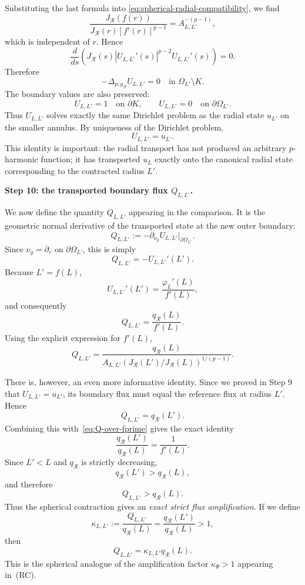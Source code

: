 \documentclass[11pt,a4paper]{article}
\theoremstyle{definition}
\theoremstyle{remark}
\begin{document}
Substituting the last formula into
\eqref{eq:spherical-radial-compatibility}, we find
\[
\frac{J_{\mathcal R}(f(r))}
{J_{\mathcal R}(r)[f'(r)]^{p-1}}
=A_{L,L'}^{-(p-1)},
\]
which is independent of $r$. Hence
\[
\frac{d}{ds}
\left(
J_{\mathcal R}(s)
|U_{L,L'}'(s)|^{p-2}U_{L,L'}'(s)
\right)=0.
\]
Therefore
\[
-\Delta_{p,g_{\mathcal R}}U_{L,L'}=0
\quad\text{in }\Omega_{L'}\setminus K.
\]
The boundary values are also preserved:
\[
U_{L,L'}=1\quad\text{on }\partial K,
\qquad
U_{L,L'}=0\quad\text{on }\partial\Omega_{L'}.
\]
Thus $U_{L,L'}$ solves exactly the same Dirichlet problem as the radial
state $u_{L'}$ on the smaller annulus. By uniqueness of the Dirichlet
problem,
\[
U_{L,L'}=u_{L'}.
\]
This identity is important: the radial transport has not produced an
arbitrary $p$-harmonic function; it has transported $u_L$ exactly onto the
canonical radial state corresponding to the contracted radius $L'$.

\medskip
\noindent
\textbf{Step 10: the transported boundary flux $Q_{L,L'}$.}

We now define the quantity $Q_{L,L'}$ appearing in the comparison.
It is the geometric normal derivative of the transported state at the new
outer boundary:
\[
Q_{L,L'}
:=-\partial_{\nu_g}U_{L,L'}
\big|_{\partial\Omega_{L'}}.
\]
Since $\nu_g=\partial_r$ on $\partial\Omega_{L'}$, this is simply
\[
Q_{L,L'}=-U_{L,L'}'(L').
\]
Because $L'=f(L)$,
\[
U_{L,L'}'(L')
=\frac{\varphi_L'(L)}{f'(L)},
\]
and consequently
\[
Q_{L,L'}
=\frac{q_{\mathcal R}(L)}{f'(L)}.
\label{eq:Q-over-fprime}
\]
Using the explicit expression for $f'(L)$,
\[
Q_{L,L'}
=
\frac{q_{\mathcal R}(L)}
{A_{L,L'}
\left(J_{\mathcal R}(L')/J_{\mathcal R}(L)\right)^{1/(p-1)}}.
\label{eq:exact-boundary-flux-transport}
\]

There is, however, an even more informative identity. Since we proved in
Step 9 that $U_{L,L'}=u_{L'}$, its boundary flux must equal the reference
flux at radius $L'$. Hence
\[
Q_{L,L'}=q_{\mathcal R}(L').
\label{eq:Q-equals-qLprime}
\]
Combining this with~\eqref{eq:Q-over-fprime} gives the exact identity
\[
\frac{q_{\mathcal R}(L')}{q_{\mathcal R}(L)}
=\frac1{f'(L)}.
\label{eq:exact-amplification-ratio}
\]
Since $L'<L$ and $q_{\mathcal R}$ is strictly decreasing,
\[
q_{\mathcal R}(L')>q_{\mathcal R}(L),
\]
and therefore
\[
Q_{L,L'}>q_{\mathcal R}(L).
\]
Thus the spherical contraction gives an \emph{exact strict flux
amplification}. If we define
\[
\kappa_{L,L'}
:=\frac{Q_{L,L'}}{q_{\mathcal R}(L)}
=\frac{q_{\mathcal R}(L')}{q_{\mathcal R}(L)}>1,
\]
then
\[
Q_{L,L'}=\kappa_{L,L'}q_{\mathcal R}(L).
\]
This is the spherical analogue of the amplification factor
$\kappa_\Psi>1$ appearing in~{\rm (RC)}.
\end{document}
